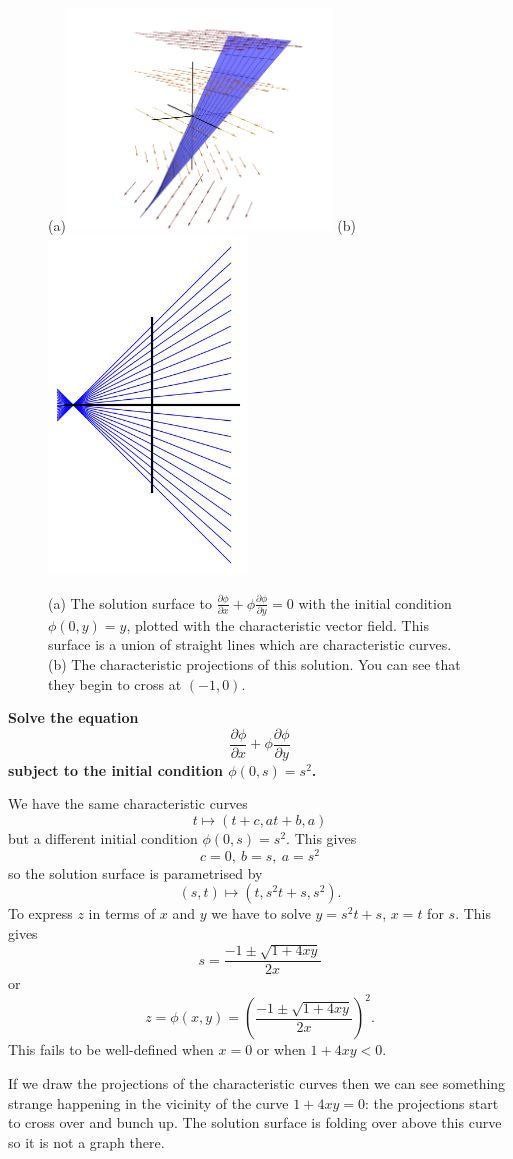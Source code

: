 \begin{figure}[htb]
\begin{center}
(a)\includegraphics[width=200pt]{quasilinear-characteristics1.jpg} (b)\includegraphics[width=150pt]{qcharacteristics1.png}
\end{center}
\caption{(a) The solution surface to $\frac{\partial\phi}{\partial x}+\phi\frac{\partial\phi}{\partial y}=0$ with the initial condition $\phi(0,y)=y$, plotted with the characteristic vector field. This surface is a union of straight lines which are characteristic curves. (b) The characteristic projections of this solution. You can see that they begin to cross at $(-1,0)$.}
\label{fig-quasilinear-characteristics-1}
\end{figure}

\begin{exm}\label{exm-burgers-2}
{\bf Solve the equation
\[\frac{\partial\phi}{\partial x}+\phi\frac{\partial\phi}{\partial y}\]
subject to the initial condition $\phi(0,s)=s^2$.}

We have the same characteristic curves
\[t\mapsto (t+c,at+b,a)\]
but a different initial condition $\phi(0,s)=s^2$. This gives
\[c=0,\ b=s,\ a=s^2\]
so the solution surface is parametrised by
\[(s,t)\mapsto (t,s^2t+s,s^2).\]
To express $z$ in terms of $x$ and $y$ we have to solve $y=s^2t+s$, $x=t$ for $s$. This gives
\[s=\frac{-1\pm \sqrt{1+4xy}}{2x}\]
or
\[z=\phi(x,y)=\left(\frac{-1\pm \sqrt{1+4xy}}{2x}\right)^2.\]
This fails to be well-defined when $x=0$ or when $1+4xy<0$.

If we draw the projections of the characteristic curves then we can see something strange happening in the vicinity of the curve $1+4xy=0$: the projections start to cross over and bunch up. The solution surface is folding over above this curve so it is not a graph there.
\end{exm}


